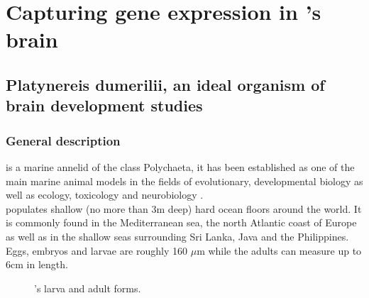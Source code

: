 %
\chapter{Capturing gene expression in \platyfull{}'s brain}\label{ch:background}
%
\section{Platynereis dumerilii, an ideal organism of brain development studies}\label{sec:platynereis}
     \subsection{General description}
     \platyfull{} is a marine annelid of the class Polychaeta, it has been established as one of the main marine animal models in the fields of evolutionary, developmental biology as well as ecology, toxicology and neurobiology \cite{hutchinson95,tessmar03,hardege99,dorresteijn90,fischer04,Fischer10}.\\
     
     \platy{} populates shallow (no more than 3m deep) hard ocean floors around the world. It is commonly found in the Mediterranean sea, the north Atlantic coast of Europe as well as in the shallow seas surrounding Sri Lanka, Java and the Philippines. Eggs, embryos and larvae are roughly 160 $\mu$m while the adults can measure up to 6cm in length.
     
     
\begin{figure}[bth]
        \myfloatalign
         \quad
        \caption{\platyfull{}'s larva and adult forms.}\label{fig:platynereis}
\end{figure}
     
